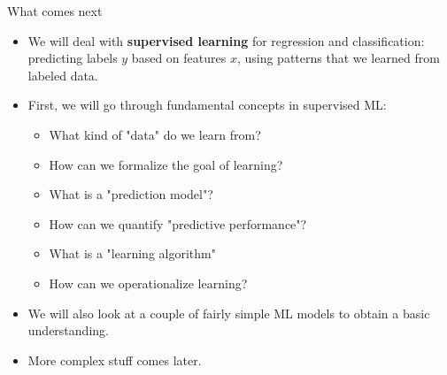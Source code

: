 \documentclass[11pt,compress,t,notes=noshow, xcolor=table]{beamer}
\begin{document}



\begin{frame}{What comes next}

\begin{itemize}

\item We will deal with \textbf{supervised learning} for regression 
and classification: predicting labels $y$ based on features $x$, using 
patterns that we learned from labeled data.
  
  \item First, we will go through fundamental concepts in supervised ML: 
  \begin{itemize}
  
    \item What kind of "data" do we learn from?
    \item How can we formalize the goal of learning?
    \item What is a "prediction model"?
    \item How can we quantify "predictive performance"?
    \item What is a "learning algorithm" 
    \item How can we operationalize learning?
  
  \end{itemize}
  
  \item We will also look at a couple of fairly simple ML models to obtain a
  basic understanding.
  
  \item More complex stuff comes later.
  
\end{itemize}

\end{frame}



\endlecture
\end{document}
